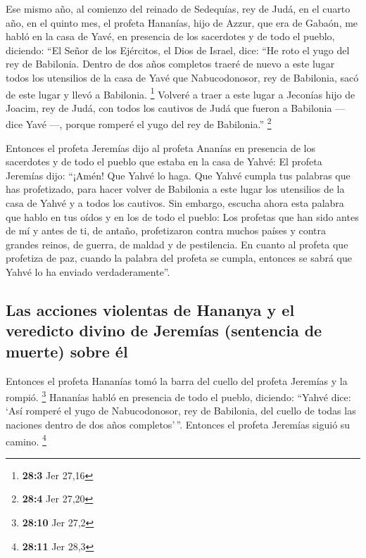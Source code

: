 \begin{paracol}{2}
 Ese mismo año, al comienzo del reinado de Sedequías, rey
de Judá, en el cuarto año, en el quinto mes, el profeta Hananías, hijo
de Azzur, que era de Gabaón, me habló en la casa de Yavé, en presencia
de los sacerdotes y de todo el pueblo, diciendo:  ``El
Señor de los Ejércitos, el Dios de Israel, dice: ``He roto el yugo del
rey de Babilonia.  Dentro de dos años completos traeré de
nuevo a este lugar todos los utensilios de la casa de Yavé que
Nabucodonosor, rey de Babilonia, sacó de este lugar y llevó a Babilonia.
\footnote{\textbf{28:3} Jer 27,16}  Volveré a traer a este
lugar a Jeconías hijo de Joacim, rey de Judá, con todos los cautivos de
Judá que fueron a Babilonia --- dice Yavé ---, porque romperé el yugo
del rey de Babilonia.'' \footnote{\textbf{28:4} Jer 27,20}

 Entonces el profeta Jeremías dijo al profeta Ananías en
presencia de los sacerdotes y de todo el pueblo que estaba en la casa de
Yahvé:  El profeta Jeremías dijo: ``¡Amén! Que Yahvé lo
haga. Que Yahvé cumpla tus palabras que has profetizado, para hacer
volver de Babilonia a este lugar los utensilios de la casa de Yahvé y a
todos los cautivos.  Sin embargo, escucha ahora esta
palabra que hablo en tus oídos y en los de todo el pueblo:
 Los profetas que han sido antes de mí y antes de ti, de
antaño, profetizaron contra muchos países y contra grandes reinos, de
guerra, de maldad y de pestilencia.  En cuanto al profeta
que profetiza de paz, cuando la palabra del profeta se cumpla, entonces
se sabrá que Yahvé lo ha enviado verdaderamente''.

\hypertarget{las-acciones-violentas-de-hananya-y-el-veredicto-divino-de-jeremuxedas-sentencia-de-muerte-sobre-uxe9l}{%
\subsection{Las acciones violentas de Hananya y el veredicto divino de
Jeremías (sentencia de muerte) sobre
él}\label{las-acciones-violentas-de-hananya-y-el-veredicto-divino-de-jeremuxedas-sentencia-de-muerte-sobre-uxe9l}}

 Entonces el profeta Hananías tomó la barra del cuello
del profeta Jeremías y la rompió. \footnote{\textbf{28:10} Jer 27,2}
 Hananías habló en presencia de todo el pueblo, diciendo:
``Yahvé dice: `Así romperé el yugo de Nabucodonosor, rey de Babilonia,
del cuello de todas las naciones dentro de dos años completos'\,''.
Entonces el profeta Jeremías siguió su camino. \footnote{\textbf{28:11}
  Jer 28,3}


\end{paracol}
